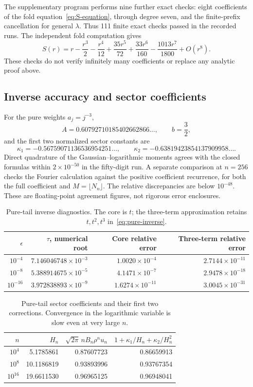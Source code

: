 \documentclass[11pt,a4paper]{article}
\numberwithin{equation}{section}
\theoremstyle{definition}
\theoremstyle{remark}
\begin{document}
The supplementary program performs nine further exact checks: eight
coefficients of the fold equation~\eqref{eq:S-equation}, through degree
seven, and the finite-prefix cancellation for general \(\lambda\).
Thus 111 finite exact checks passed in the recorded runs. The independent
fold computation gives
\[
 S(r)=r-\frac{r^3}{2}-\frac{r^4}{12}
 +\frac{35r^5}{72}+\frac{33r^6}{160}
 -\frac{1013r^7}{1800}+O(r^8).
\]
These checks do not verify infinitely many coefficients or replace any
analytic proof above.

\subsection{Inverse accuracy and sector coefficients}
For the pure weights \(a_j=j^{-3}\),
\[
 A=0.60792710185402662866\ldots,\qquad b=\frac32,
\]
and the first two normalized sector constants are
\[
 \kappa_1=-0.56759071136536954251\ldots,\qquad
 \kappa_2=-0.63819423854137909958\ldots.
\]
Direct quadrature of the Gaussian--logarithmic moments agrees with the
closed formulas within \(2\times10^{-50}\) in the fifty-digit run.
A separate comparison at \(n=256\) checks the Fourier calculation against
the positive coefficient recurrence, for both the full coefficient and
\(M=\lfloor N_n\rfloor\). The relative discrepancies are below
\(10^{-48}\). These are floating-point agreement figures, not rigorous
error enclosures.

\begin{table}[htbp]
\centering\small
\begin{tabular}{@{}rrrr@{}}
\toprule
\(\epsilon\)&\(\tau\), numerical root&Core relative error&Three-term relative error\\
\midrule
\(10^{-4}\)&\(7.146046748\times10^{-3}\)&\(1.0020\times10^{-4}\)&\(2.7144\times10^{-11}\)\\
\(10^{-8}\)&\(5.388914675\times10^{-5}\)&\(4.1471\times10^{-7}\)&\(2.9478\times10^{-18}\)\\
\(10^{-16}\)&\(3.972838893\times10^{-9}\)&\(1.6274\times10^{-11}\)&\(3.0045\times10^{-31}\)\\
\bottomrule
\end{tabular}
\caption{Pure-tail inverse diagnostics. The core is \(t\); the three-term
approximation retains \(t,t^2,t^3\) in~\eqref{eq:pure-inverse}.}
\label{tab:inverse}
\end{table}

\begin{table}[htbp]
\centering\small
\begin{tabular}{@{}rrrr@{}}
\toprule
\(n\)&\(H_n\)&\(\sqrt{2\pi}\,nB_n\rho^n u_n\)&\(1+\kappa_1/H_n+\kappa_2/H_n^2\)\\
\midrule
\(10^4\)&5.1785861&0.87607723&0.86659913\\
\(10^8\)&10.1186819&0.93893996&0.93767354\\
\(10^{16}\)&19.6611530&0.96965125&0.96948041\\
\bottomrule
\end{tabular}
\caption{Pure-tail sector coefficients and their first two corrections.
Convergence in the logarithmic variable is slow even at very large \(n\).}
\label{tab:coefficients}
\end{table}
\end{document}
